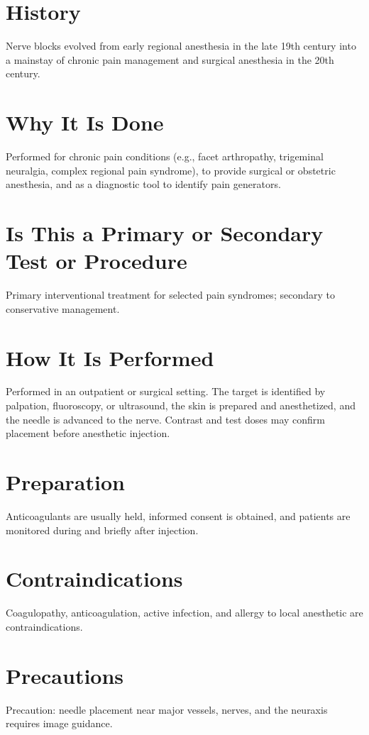 \section*{History}
Nerve blocks evolved from early regional anesthesia in the late 19th century into a mainstay of chronic pain management and surgical anesthesia in the 20th century.

\section*{Why It Is Done}
Performed for chronic pain conditions (e.g., facet arthropathy, trigeminal neuralgia, complex regional pain syndrome), to provide surgical or obstetric anesthesia, and as a diagnostic tool to identify pain generators.

\section*{Is This a Primary or Secondary Test or Procedure}
Primary interventional treatment for selected pain syndromes; secondary to conservative management.

\section*{How It Is Performed}
Performed in an outpatient or surgical setting. The target is identified by palpation, fluoroscopy, or ultrasound, the skin is prepared and anesthetized, and the needle is advanced to the nerve. Contrast and test doses may confirm placement before anesthetic injection.

\section*{Preparation}
Anticoagulants are usually held, informed consent is obtained, and patients are monitored during and briefly after injection.

\section*{Contraindications}
Coagulopathy, anticoagulation, active infection, and allergy to local anesthetic are contraindications.

\section*{Precautions}
Precaution: needle placement near major vessels, nerves, and the neuraxis requires image guidance.

